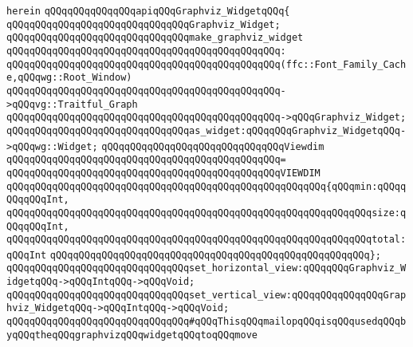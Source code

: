 \verb|herein|\newline
\newline
\verb|qQQqqQQqqQQqqQQqapiqQQqGraphviz_WidgetqQQq{|\newline
\newline
\verb|qQQqqQQqqQQqqQQqqQQqqQQqqQQqqQQqGraphviz_Widget;|\newline
\newline
\verb|qQQqqQQqqQQqqQQqqQQqqQQqqQQqqQQqmake_graphviz_widget|\newline
\verb|qQQqqQQqqQQqqQQqqQQqqQQqqQQqqQQqqQQqqQQqqQQqqQQq:|\newline
\verb|qQQqqQQqqQQqqQQqqQQqqQQqqQQqqQQqqQQqqQQqqQQqqQQq(ffc::Font_Family_Cache,qQQqwg::Root_Window)|\newline
\verb|qQQqqQQqqQQqqQQqqQQqqQQqqQQqqQQqqQQqqQQqqQQqqQQq->qQQqvg::Traitful_Graph|\newline
\verb|qQQqqQQqqQQqqQQqqQQqqQQqqQQqqQQqqQQqqQQqqQQqqQQq->qQQqGraphviz_Widget;|\newline
\newline
\verb|qQQqqQQqqQQqqQQqqQQqqQQqqQQqqQQqas_widget:qQQqqQQqGraphviz_WidgetqQQq->qQQqwg::Widget;|\newline
\newline
\verb|qQQqqQQqqQQqqQQqqQQqqQQqqQQqqQQqViewdim|\newline
\verb|qQQqqQQqqQQqqQQqqQQqqQQqqQQqqQQqqQQqqQQqqQQqqQQq=|\newline
\verb|qQQqqQQqqQQqqQQqqQQqqQQqqQQqqQQqqQQqqQQqqQQqqQQqVIEWDIM|\newline
\verb|qQQqqQQqqQQqqQQqqQQqqQQqqQQqqQQqqQQqqQQqqQQqqQQqqQQqqQQq{qQQqmin:qQQqqQQqqQQqInt,|\newline
\verb|qQQqqQQqqQQqqQQqqQQqqQQqqQQqqQQqqQQqqQQqqQQqqQQqqQQqqQQqqQQqqQQqsize:qQQqqQQqInt,|\newline
\verb|qQQqqQQqqQQqqQQqqQQqqQQqqQQqqQQqqQQqqQQqqQQqqQQqqQQqqQQqqQQqqQQqtotal:qQQqInt|\newline
\verb|qQQqqQQqqQQqqQQqqQQqqQQqqQQqqQQqqQQqqQQqqQQqqQQqqQQqqQQq};|\newline
\newline
\verb|qQQqqQQqqQQqqQQqqQQqqQQqqQQqqQQqset_horizontal_view:qQQqqQQqGraphviz_WidgetqQQq->qQQqIntqQQq->qQQqVoid;|\newline
\verb|qQQqqQQqqQQqqQQqqQQqqQQqqQQqqQQqset_vertical_view:qQQqqQQqqQQqqQQqGraphviz_WidgetqQQq->qQQqIntqQQq->qQQqVoid;|\newline
\newline
\verb|qQQqqQQqqQQqqQQqqQQqqQQqqQQqqQQq#qQQqThisqQQqmailopqQQqisqQQqusedqQQqbyqQQqtheqQQqgraphvizqQQqwidgetqQQqtoqQQqmove|\newline
